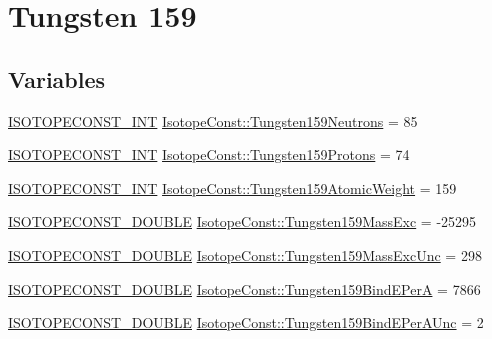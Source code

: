 \hypertarget{group___isotope_const-_tungsten-_w159}{}\section{Tungsten 159}
\label{group___isotope_const-_tungsten-_w159}
\subsection*{Variables}
\begin{DoxyCompactItemize}
\item 
\mbox{\hyperlink{group___isotope_const-_macros_ga5f18360b3e99483a35c32d789e62621c}{I\+S\+O\+T\+O\+P\+E\+C\+O\+N\+S\+T\+\_\+\+I\+NT}} \mbox{\hyperlink{group___isotope_const-_tungsten-_w159_ga501b17e9da791f91d34b52a33641ffd6}{Isotope\+Const\+::\+Tungsten159\+Neutrons}} = 85
\item 
\mbox{\hyperlink{group___isotope_const-_macros_ga5f18360b3e99483a35c32d789e62621c}{I\+S\+O\+T\+O\+P\+E\+C\+O\+N\+S\+T\+\_\+\+I\+NT}} \mbox{\hyperlink{group___isotope_const-_tungsten-_w159_ga2b3dd2781cbb28ebfe022fb63293eb54}{Isotope\+Const\+::\+Tungsten159\+Protons}} = 74
\item 
\mbox{\hyperlink{group___isotope_const-_macros_ga5f18360b3e99483a35c32d789e62621c}{I\+S\+O\+T\+O\+P\+E\+C\+O\+N\+S\+T\+\_\+\+I\+NT}} \mbox{\hyperlink{group___isotope_const-_tungsten-_w159_ga790ac3d99991fe0f4ff22d29262e3fb8}{Isotope\+Const\+::\+Tungsten159\+Atomic\+Weight}} = 159
\item 
\mbox{\hyperlink{group___isotope_const-_macros_ga8f45a7272ce02c0b4c65c44636ed719a}{I\+S\+O\+T\+O\+P\+E\+C\+O\+N\+S\+T\+\_\+\+D\+O\+U\+B\+LE}} \mbox{\hyperlink{group___isotope_const-_tungsten-_w159_gafc14443fcffff16c626d0d964fedfb94}{Isotope\+Const\+::\+Tungsten159\+Mass\+Exc}} = -\/25295
\item 
\mbox{\hyperlink{group___isotope_const-_macros_ga8f45a7272ce02c0b4c65c44636ed719a}{I\+S\+O\+T\+O\+P\+E\+C\+O\+N\+S\+T\+\_\+\+D\+O\+U\+B\+LE}} \mbox{\hyperlink{group___isotope_const-_tungsten-_w159_gad01e68d4f012163e96ad1c23f263a22d}{Isotope\+Const\+::\+Tungsten159\+Mass\+Exc\+Unc}} = 298
\item 
\mbox{\hyperlink{group___isotope_const-_macros_ga8f45a7272ce02c0b4c65c44636ed719a}{I\+S\+O\+T\+O\+P\+E\+C\+O\+N\+S\+T\+\_\+\+D\+O\+U\+B\+LE}} \mbox{\hyperlink{group___isotope_const-_tungsten-_w159_gab6c789cc83c6f4bfc6faada9e46965d3}{Isotope\+Const\+::\+Tungsten159\+Bind\+E\+PerA}} = 7866
\item 
\mbox{\hyperlink{group___isotope_const-_macros_ga8f45a7272ce02c0b4c65c44636ed719a}{I\+S\+O\+T\+O\+P\+E\+C\+O\+N\+S\+T\+\_\+\+D\+O\+U\+B\+LE}} \mbox{\hyperlink{group___isotope_const-_tungsten-_w159_ga7edd5a49e84343f390f99a7f1066f2c2}{Isotope\+Const\+::\+Tungsten159\+Bind\+E\+Per\+A\+Unc}} = 2

\end{DoxyCompactItemize}
